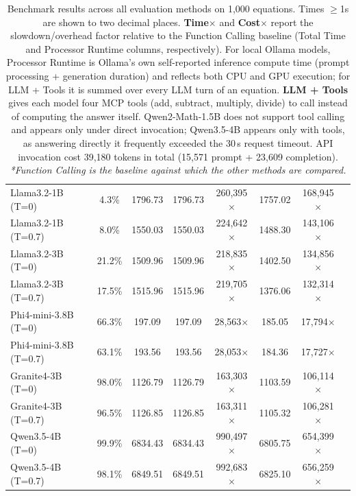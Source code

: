 \begin{table}[t]
\begin{tabular}{lccccccc}
\hline
Llama3.2-1B (T=0) & 4.3\% & 1796.73 & 1796.73 & 260{,}395$\times$ & 1757.02 & 168{,}945$\times$ \\
Llama3.2-1B (T=0.7) & 8.0\% & 1550.03 & 1550.03 & 224{,}642$\times$ & 1488.30 & 143{,}106$\times$ \\
Llama3.2-3B (T=0) & 21.2\% & 1509.96 & 1509.96 & 218{,}835$\times$ & 1402.50 & 134{,}856$\times$ \\
Llama3.2-3B (T=0.7) & 17.5\% & 1515.96 & 1515.96 & 219{,}705$\times$ & 1376.06 & 132{,}314$\times$ \\
Phi4-mini-3.8B (T=0) & 66.3\% & 197.09 & 197.09 & 28{,}563$\times$ & 185.05 & 17{,}794$\times$ \\
Phi4-mini-3.8B (T=0.7) & 63.1\% & 193.56 & 193.56 & 28{,}053$\times$ & 184.36 & 17{,}727$\times$ \\
Granite4-3B (T=0) & 98.0\% & 1126.79 & 1126.79 & 163{,}303$\times$ & 1103.59 & 106{,}114$\times$ \\
Granite4-3B (T=0.7) & 96.5\% & 1126.85 & 1126.85 & 163{,}311$\times$ & 1105.32 & 106{,}281$\times$ \\
Qwen3.5-4B (T=0) & 99.9\% & 6834.43 & 6834.43 & 990{,}497$\times$ & 6805.75 & 654{,}399$\times$ \\
Qwen3.5-4B (T=0.7) & 98.1\% & 6849.51 & 6849.51 & 992{,}683$\times$ & 6825.10 & 656{,}259$\times$ \\
\hline
\end{tabular}
\caption{Benchmark results across all evaluation methods on 1{,}000 equations. Times $\geq$1s are shown to two decimal places. \textbf{Time$\times$} and \textbf{Cost$\times$} report the slowdown/overhead factor relative to the Function Calling baseline (Total Time and Processor Runtime columns, respectively). For local Ollama models, Processor Runtime is Ollama's own self-reported inference compute time (prompt processing + generation duration) and reflects both CPU and GPU execution; for LLM + Tools it is summed over every LLM turn of an equation. \textbf{LLM + Tools} gives each model four MCP tools (add, subtract, multiply, divide) to call instead of computing the answer itself. Qwen2-Math-1.5B does not support tool calling and appears only under direct invocation; Qwen3.5-4B appears only with tools, as answering directly it frequently exceeded the 30\,s request timeout. API invocation cost 39{,}180 tokens in total (15{,}571 prompt + 23{,}609 completion). \textit{*Function Calling is the baseline against which the other methods are compared.}}
\label{tab:results}
\end{table}
